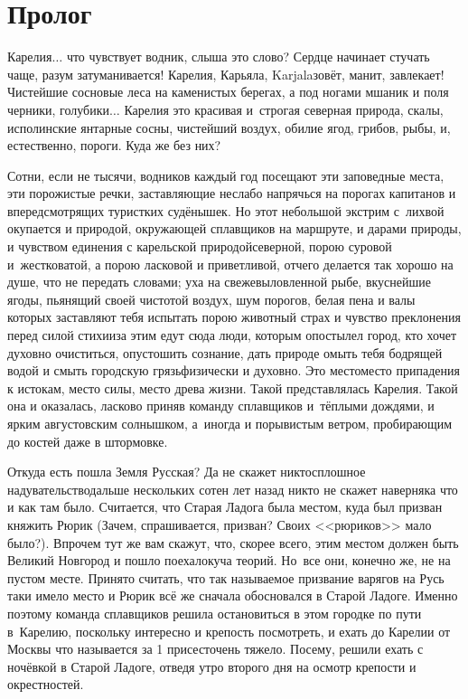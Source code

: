 {

{
\cleardoublepage
{}


\section*{Пролог}

\fancyhead[LE]{\fancyplain{}{}}
\fancyhead[RO]{\fancyplain{}{}}

Карелия$\ldots$ что чувствует водник, слыша это слово? Сердце начинает стучать чаще, разум затуманивается! Карелия, Карьяла, Karjala\mdash зовёт, манит, завлекает! Чистейшие сосновые леса на каменистых берегах, а под ногами мшаник и поля черники, голубики$\ldots$ Карелия это красивая и~строгая северная природа, скалы, исполинские янтарные сосны, чистейший воздух, обилие ягод, грибов, рыбы, и, естественно, пороги. Куда же без них? 

Сотни, если не тысячи, водников каждый год посещают эти заповедные места, эти порожистые речки, заставляющие неслабо напрячься на порогах капитанов и впередсмотрящих туристких судёнышек. Но этот небольшой экстрим с~лихвой окупается и природой, окружающей сплавщиков на маршруте, и дарами природы, и чувством единения с карельской природой\mdash северной, порою суровой и~жестковатой, а порою ласковой и приветливой, отчего делается так хорошо на душе, что не передать словами; уха на свежевыловленной рыбе, вкуснейшие ягоды, пьянящий своей чистотой воздух, шум порогов, белая пена и валы которых заставляют тебя испытать порою животный страх и чувство преклонения перед силой стихии\mdash за этим едут сюда люди, которым опостылел город, кто хочет духовно очиститься, опустошить сознание, дать природе омыть тебя бодрящей водой и смыть городскую грязь\mdash физически и духовно. Это место\mdash место припадения к истокам, место силы, место древа жизни. Такой представлялась Карелия. Такой она и оказалась, ласково приняв команду сплавщиков и~тёплыми дождями, и ярким августовским солнышком, а~иногда и порывистым ветром, пробирающим до костей даже в штормовке.  

Откуда есть пошла Земля Русская? Да не скажет никто\mdash сплошное надувательство\mdash дальше нескольких сотен лет назад никто не скажет наверняка что и как там было. Считается, что Старая Ладога была местом, куда был призван княжить Рюрик (Зачем, спрашивается, призван? Своих <<рюриков>> мало было?). Впрочем тут же вам скажут, что, скорее всего, этим местом должен быть Великий Новгород и пошло поехало\mdash куча теорий. Но~все они, конечно же, не на пустом месте. Принято считать, что так называемое призвание варягов на Русь таки имело место и Рюрик всё же сначала обосновался в Старой Ладоге. Именно поэтому команда сплавщиков решила остановиться в этом городке по пути в~Карелию, поскольку интересно и крепость посмотреть, и ехать до Карелии от Москвы что называется за 1 присест\mdash очень тяжело. Посему, решили ехать с ночёвкой в Старой Ладоге, отведя утро второго дня на осмотр крепости и окрестностей. 

}}
